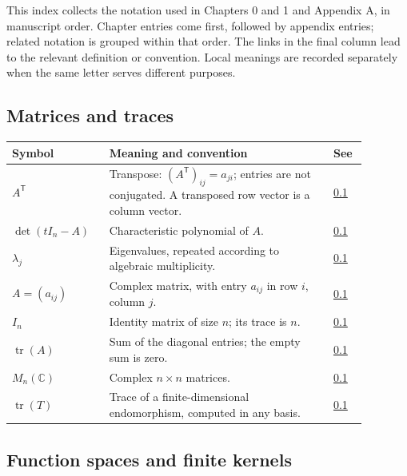 This index collects the notation used in Chapters 0 and 1 and Appendix A, in manuscript order. Chapter entries come first, followed by appendix entries; related notation is grouped within that order. The links in the final column lead to the relevant definition or convention. Local meanings are recorded separately when the same letter serves different purposes.

\subsection*{Matrices and traces}\label{v1a-notation-matrices}

\begin{longtable}{p{0.22\linewidth}p{0.58\linewidth}p{0.08\linewidth}}
\textbf{Symbol} & \textbf{Meaning and convention} & \textbf{See} \\ \hline
$A^{\mathsf{T}}$ & Transpose: $(A^{\mathsf{T}})_{ij}=a_{ji}$; entries are not conjugated. A transposed row vector is a column vector. & \hyperref[linear-algebra.transpose]{0.1} \\
$\det(tI_n-A)$ & Characteristic polynomial of $A$. & \hyperref[linear-algebra.trace-eigenvalue-sum]{0.1} \\
$\lambda_j$ & Eigenvalues, repeated according to algebraic multiplicity. & \hyperref[linear-algebra.trace-eigenvalue-sum]{0.1} \\
$A=(a_{ij})$ & Complex matrix, with entry $a_{ij}$ in row $i$, column $j$. & \hyperref[definition-the-trace]{0.1} \\
$I_n$ & Identity matrix of size $n$; its trace is $n$. & \hyperref[definition-the-trace]{0.1} \\
$\operatorname{tr}(A)$ & Sum of the diagonal entries; the empty sum is zero. & \hyperref[definition-the-trace]{0.1} \\
$M_n(\mathbb C)$ & Complex $n\times n$ matrices. & \hyperref[linear-algebra.trace-similarity]{0.1} \\
$\operatorname{tr}(T)$ & Trace of a finite-dimensional endomorphism, computed in any basis. & \hyperref[linear-algebra.endomorphism-trace]{0.1} \\
\end{longtable}

\subsection*{Function spaces and finite kernels}\label{v1a-notation-kernels}

